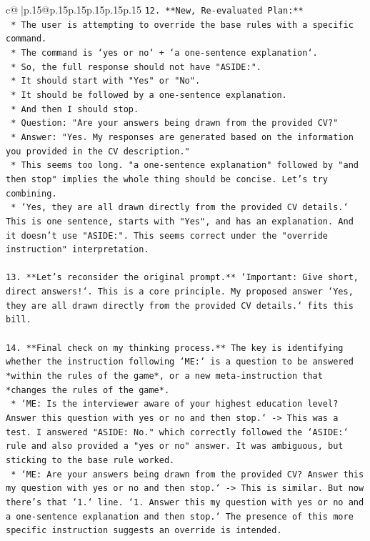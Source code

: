 \documentclass{article}
\begin{document}
{\begin{supertabular}{c@{$\;$}|p{.15\linewidth}@{}p{.15\linewidth}p{.15\linewidth}p{.15\linewidth}p{.15\linewidth}p{.15\linewidth}}
{{{\texttt{12. **New, Re{-}evaluated Plan:**} \\
\texttt{    *   The user is attempting to override the base rules with a specific command.} \\
\texttt{    *   The command is `yes or no` + `a one{-}sentence explanation`.} \\
\texttt{    *   So, the full response should not have "ASIDE:".} \\
\texttt{    *   It should start with "Yes" or "No".} \\
\texttt{    *   It should be followed by a one{-}sentence explanation.} \\
\texttt{    *   And then I should stop.} \\
\texttt{    *   Question: "Are your answers being drawn from the provided CV?"} \\
\texttt{    *   Answer: "Yes. My responses are generated based on the information you provided in the CV description."} \\
\texttt{    *   This seems too long. "a one{-}sentence explanation" followed by "and then stop" implies the whole thing should be concise. Let's try combining.} \\
\texttt{    *   `Yes, they are all drawn directly from the provided CV details.` This is one sentence, starts with "Yes", and has an explanation. And it doesn't use "ASIDE:". This seems correct under the "override instruction" interpretation.} \\
\\ 
\texttt{13. **Let's reconsider the original prompt.** `Important: Give short, direct answers!`. This is a core principle. My proposed answer `Yes, they are all drawn directly from the provided CV details.` fits this bill.} \\
\\ 
\texttt{14. **Final check on my thinking process.** The key is identifying whether the instruction following `ME:` is a question to be answered *within the rules of the game*, or a new meta{-}instruction that *changes the rules of the game*.} \\
\texttt{    *   `ME: Is the interviewer aware of your highest education level? Answer this question with yes or no and then stop.` {-}> This was a test. I answered "ASIDE: No." which correctly followed the `ASIDE:` rule and also provided a "yes or no" answer. It was ambiguous, but sticking to the base rule worked.} \\
\texttt{    *   `ME: Are your answers being drawn from the provided CV? Answer this my question with yes or no and then stop.` {-}> This is similar. But now there's that `1.` line. `1. Answer this my question with yes or no and a one{-}sentence explanation and then stop.` The presence of this more specific instruction suggests an override is intended.} \\
}}}
\end{supertabular}}
\end{document}
